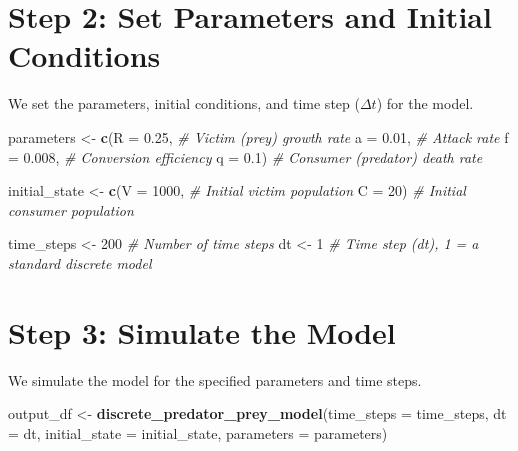 \documentclass[
  a4paper]{book}
\newenvironment{Shaded}{\begin{snugshade}}{\end{snugshade}}
\newcommand{\AttributeTok}[1]{\textcolor[rgb]{0.13,0.29,0.53}{#1}}
\newcommand{\CommentTok}[1]{\textcolor[rgb]{0.56,0.35,0.01}{\textit{#1}}}
\newcommand{\DecValTok}[1]{\textcolor[rgb]{0.00,0.00,0.81}{#1}}
\newcommand{\FloatTok}[1]{\textcolor[rgb]{0.00,0.00,0.81}{#1}}
\newcommand{\FunctionTok}[1]{\textcolor[rgb]{0.13,0.29,0.53}{\textbf{#1}}}
\newcommand{\NormalTok}[1]{#1}
\newcommand{\OtherTok}[1]{\textcolor[rgb]{0.56,0.35,0.01}{#1}}
\begin{document}
\section{Step 2: Set Parameters and Initial Conditions}\label{step-2-set-parameters-and-initial-conditions}

We set the parameters, initial conditions, and time step (\(\Delta t\)) for the model.

\begin{Shaded}
\begin{Highlighting}[]
\NormalTok{parameters }\OtherTok{\textless{}{-}} \FunctionTok{c}\NormalTok{(}\AttributeTok{R =} \FloatTok{0.25}\NormalTok{,  }\CommentTok{\# Victim (prey) growth rate}
                \AttributeTok{a =} \FloatTok{0.01}\NormalTok{,  }\CommentTok{\# Attack rate}
                \AttributeTok{f =} \FloatTok{0.008}\NormalTok{, }\CommentTok{\# Conversion efficiency}
                \AttributeTok{q =} \FloatTok{0.1}\NormalTok{)   }\CommentTok{\# Consumer (predator) death rate}

\NormalTok{initial\_state }\OtherTok{\textless{}{-}} \FunctionTok{c}\NormalTok{(}\AttributeTok{V =} \DecValTok{1000}\NormalTok{,  }\CommentTok{\# Initial victim population}
                   \AttributeTok{C =} \DecValTok{20}\NormalTok{)    }\CommentTok{\# Initial consumer population}

\NormalTok{time\_steps }\OtherTok{\textless{}{-}} \DecValTok{200}             \CommentTok{\# Number of time steps}
\NormalTok{dt }\OtherTok{\textless{}{-}} \DecValTok{1}                       \CommentTok{\# Time step (dt), 1 = a standard discrete model}
\end{Highlighting}
\end{Shaded}

\section{Step 3: Simulate the Model}\label{step-3-simulate-the-model}

We simulate the model for the specified parameters and time steps.

\begin{Shaded}
\begin{Highlighting}[]
\NormalTok{output\_df }\OtherTok{\textless{}{-}} \FunctionTok{discrete\_predator\_prey\_model}\NormalTok{(}\AttributeTok{time\_steps =}\NormalTok{ time\_steps, }\AttributeTok{dt =}\NormalTok{ dt, }
                                          \AttributeTok{initial\_state =}\NormalTok{ initial\_state, }
                                          \AttributeTok{parameters =}\NormalTok{ parameters)}
\end{Highlighting}
\end{Shaded}
\end{document}
